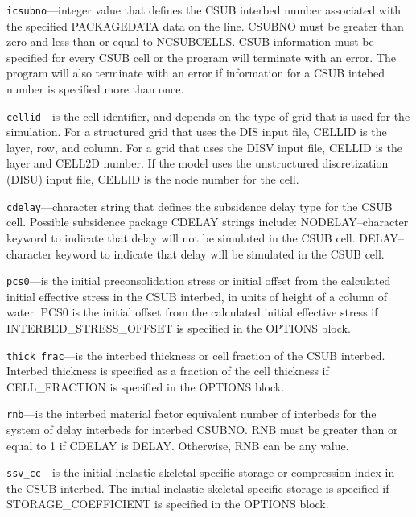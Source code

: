 \begin{description}
\item \texttt{icsubno}---integer value that defines the CSUB interbed number associated with the specified PACKAGEDATA data on the line. CSUBNO must be greater than zero and less than or equal to NCSUBCELLS.  CSUB information must be specified for every CSUB cell or the program will terminate with an error.  The program will also terminate with an error if information for a CSUB intebed number is specified more than once.

\item \texttt{cellid}---is the cell identifier, and depends on the type of grid that is used for the simulation.  For a structured grid that uses the DIS input file, CELLID is the layer, row, and column.   For a grid that uses the DISV input file, CELLID is the layer and CELL2D number.  If the model uses the unstructured discretization (DISU) input file, CELLID is the node number for the cell.

\item \texttt{cdelay}---character string that defines the subsidence delay type for the CSUB cell. Possible subsidence package CDELAY strings include: NODELAY--character keyword to indicate that delay will not be simulated in the CSUB cell.  DELAY--character keyword to indicate that delay will be simulated in the CSUB cell.

\item \texttt{pcs0}---is the initial preconsolidation stress or initial offset from the calculated initial effective stress in the CSUB interbed, in units of height of a column of water. PCS0 is the initial offset from the calculated initial effective stress if INTERBED\_STRESS\_OFFSET is specified in the OPTIONS block.

\item \texttt{thick\_frac}---is the interbed thickness or cell fraction of the CSUB interbed. Interbed thickness is specified as a fraction of the cell thickness if CELL\_FRACTION is specified in the OPTIONS block.

\item \texttt{rnb}---is the interbed material factor equivalent number of interbeds for the system of delay interbeds for interbed CSUBNO. RNB must be greater than or equal to 1 if CDELAY is DELAY. Otherwise, RNB can be any value.

\item \texttt{ssv\_cc}---is the initial inelastic skeletal specific storage or compression index in the CSUB interbed. The initial inelastic skeletal specific storage is specified if STORAGE\_COEFFICIENT is specified in the OPTIONS block.


\end{description}
